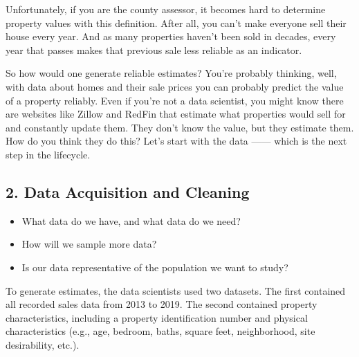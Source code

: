 \documentclass[
  letterpaper,
  DIV=11,
  numbers=noendperiod]{scrreprt}
\providecommand{\tightlist}{%
  \setlength{\itemsep}{0pt}\setlength{\parskip}{0pt}}\usepackage{longtable,booktabs,array}
\begin{document}
Unfortunately, if you are the county assessor, it becomes hard to
determine property values with this definition. After all, you can't
make everyone sell their house every year. And as many properties
haven't been sold in decades, every year that passes makes that previous
sale less reliable as an indicator.

So how would one generate reliable estimates? You're probably thinking,
well, with data about homes and their sale prices you can probably
predict the value of a property reliably. Even if you're not a data
scientist, you might know there are websites like Zillow and RedFin that
estimate what properties would sell for and constantly update them. They
don't know the value, but they estimate them. How do you think they do
this? Let's start with the data ------ which is the next step in the
lifecycle.

\subsection{2. Data Acquisition and
Cleaning}\label{data-acquisition-and-cleaning}

\begin{tcolorbox}[enhanced jigsaw, arc=.35mm, colbacktitle=quarto-callout-note-color!10!white, coltitle=black, bottomrule=.15mm, leftrule=.75mm, bottomtitle=1mm, colback=white, toptitle=1mm, breakable, titlerule=0mm, rightrule=.15mm, colframe=quarto-callout-note-color-frame, opacitybacktitle=0.6, left=2mm, title=\textcolor{quarto-callout-note-color}{\faInfo}\hspace{0.5em}{Driving Questions}, toprule=.15mm, opacityback=0]

\begin{itemize}
\tightlist
\item
  What data do we have, and what data do we need?
\item
  How will we sample more data?
\item
  Is our data representative of the population we want to study?
\end{itemize}

\end{tcolorbox}

To generate estimates, the data scientists used two datasets. The first
contained all recorded sales data from 2013 to 2019. The second
contained property characteristics, including a property identification
number and physical characteristics (e.g., age, bedroom, baths, square
feet, neighborhood, site desirability, etc.).
\end{document}
